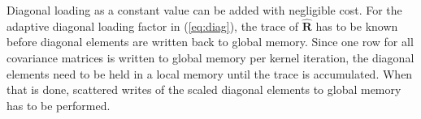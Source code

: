 \documentclass[journal]{IEEEtran}
\newcommand{\mat}[1]{\mathbf{#1}}
\begin{document}
Diagonal loading as a constant value can be added with negligible cost. For the adaptive diagonal loading factor in (\ref{eq:diag}), the trace of $\mat{\hat{R}}$ has to be known before diagonal elements are written back to global memory. Since one row for all covariance matrices is written to global memory per kernel iteration, the diagonal elements need to be held in a local memory until the trace is accumulated. When that is done, scattered writes of the scaled diagonal elements to global memory has to be performed. 





\end{document}
